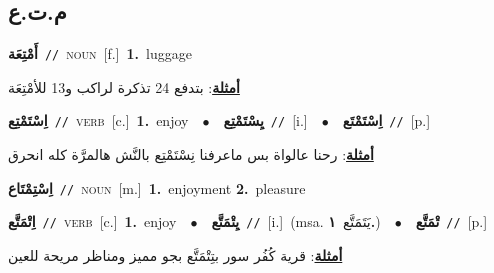 \documentclass[10pt,a4paper,twoside]{article} %
\begin{document}
\begin{multicols}{2}
{{\vspace{-3mm}
\subsection*{\color{blue}\foreignlanguage{arabic}{م.ت.ع}\color{blue}{}} 

{\setlength\topsep{0pt}\textbf{\foreignlanguage{arabic}{أَمْتِعَة}}\ {\color{gray}\texttt{//}\color{black}}\ \textsc{noun}\ [f.]\ \textbf{1.}~luggage\  \begin{flushright}\color{gray}\foreignlanguage{arabic}{\textbf{\underline{\foreignlanguage{arabic}{أمثلة}}}: بتدفع 24 تذكرة لراكب و13 للأمْتِعَة}\end{flushright}\color{black}} \vspace{2mm}

{\setlength\topsep{0pt}\textbf{\foreignlanguage{arabic}{اِسْتَمْتِع}}\ {\color{gray}\texttt{//}\color{black}}\ \textsc{verb}\ [c.]\ \textbf{1.}~enjoy\ \ $\bullet$\ \ \setlength\topsep{0pt}\textbf{\foreignlanguage{arabic}{يِسْتَمْتِع}}\ {\color{gray}\texttt{//}\color{black}}\ [i.]\ \ $\bullet$\ \ \setlength\topsep{0pt}\textbf{\foreignlanguage{arabic}{اِسْتَمْتَع}}\ {\color{gray}\texttt{//}\color{black}}\ [p.]\  \begin{flushright}\color{gray}\foreignlanguage{arabic}{\textbf{\underline{\foreignlanguage{arabic}{أمثلة}}}: رحنا عالواة بس ماعرفنا نِسْتَمْتِع بالنَّش هالمرَّة كله انحرق}\end{flushright}\color{black}} \vspace{2mm}

{\setlength\topsep{0pt}\textbf{\foreignlanguage{arabic}{اِسْتِمْتَاع}}\ {\color{gray}\texttt{//}\color{black}}\ \textsc{noun}\ [m.]\ \textbf{1.}~enjoyment  \textbf{2.}~pleasure\ 

{\setlength\topsep{0pt}\textbf{\foreignlanguage{arabic}{اِتْمَتَّع}}\ {\color{gray}\texttt{//}\color{black}}\ \textsc{verb}\ [c.]\ \textbf{1.}~enjoy\ \ $\bullet$\ \ \setlength\topsep{0pt}\textbf{\foreignlanguage{arabic}{يِتْمَتَّع}}\ {\color{gray}\texttt{//}\color{black}}\ [i.]\ \color{gray}(msa. \foreignlanguage{arabic}{يَتَمَتَّع}~\foreignlanguage{arabic}{\textbf{١.}})\color{black}\ \ $\bullet$\ \ \setlength\topsep{0pt}\textbf{\foreignlanguage{arabic}{تْمَتَّع}}\ {\color{gray}\texttt{//}\color{black}}\ [p.]\  \begin{flushright}\color{gray}\foreignlanguage{arabic}{\textbf{\underline{\foreignlanguage{arabic}{أمثلة}}}: قرية كُفُر سور بتِتْمَتَّع بجو مميز ومناظر مريحة للعين}\end{flushright}\color{black}} \vspace{2mm}

}}}
\end{multicols}
\end{document}
